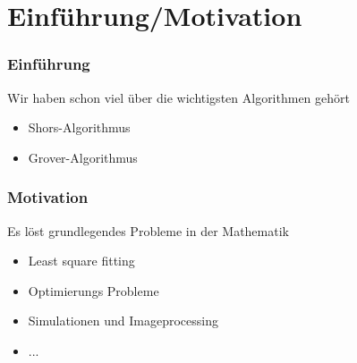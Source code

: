 \section{Einführung/Motivation}


    \begin{frame}
        \frametitle{Einführung}
        Wir haben schon viel über die wichtigsten Algorithmen gehört
        \begin{itemize} 
            \item  Shors-Algorithmus
            \item  Grover-Algorithmus
        \end{itemize}

        \hfill


    \end{frame}



    \begin{frame}
        \frametitle{Motivation}

        Es löst grundlegendes Probleme in der Mathematik
        \begin{itemize}
            \item   Least square fitting 
            \item   Optimierungs Probleme
            \item   Simulationen und Imageprocessing
            \item   ...
       \end{itemize}

        \hfil

    \end{frame}


